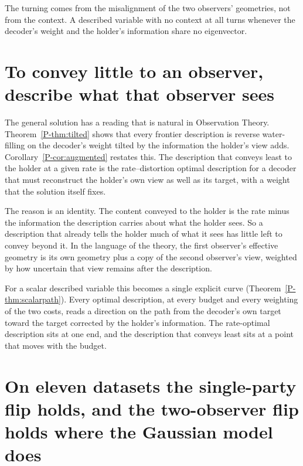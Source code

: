 \documentclass[11pt]{article}
\newcommand{\Th}[1]{Theorem~\ref{P-#1}}
\newcommand{\Co}[1]{Corollary~\ref{P-#1}}
\begin{document}
The turning comes from the misalignment of the two observers'
geometries, not from the context. A described variable with no context
at all turns whenever the decoder's weight and the holder's information
share no eigenvector.

\section{To convey little to an observer, describe what that observer sees}
\label{sec:augmented}

The general solution has a reading that is natural in Observation
Theory. \Th{thm:tilted} shows that every frontier description is reverse
water-filling on the decoder's weight tilted by the information the
holder's view adds. \Co{cor:augmented} restates this. The description that conveys least to
the holder at a given rate is the rate--distortion optimal description
for a decoder that must reconstruct the holder's own view as well as its
target, with a weight that the solution itself fixes.

The reason is an identity. The content conveyed to the holder is the
rate minus the information the description carries about what the
holder sees. So a description that already tells the holder much of what
it sees has little left to convey beyond it. In the language of the
theory, the first observer's effective geometry is its own geometry plus
a copy of the second observer's view, weighted by how uncertain that view
remains after the description.

For a scalar described variable this becomes a single explicit curve
(\Th{thm:scalarpath}). Every optimal description, at every budget and
every weighting of the two costs, reads a direction on the path from the
decoder's own target toward the target corrected by the holder's
information. The rate-optimal description sits at one end, and the
description that conveys least sits at a point that moves with the
budget.

\section{On eleven datasets the single-party flip holds, and the two-observer flip holds where the Gaussian model does}
\label{sec:data}
\end{document}
